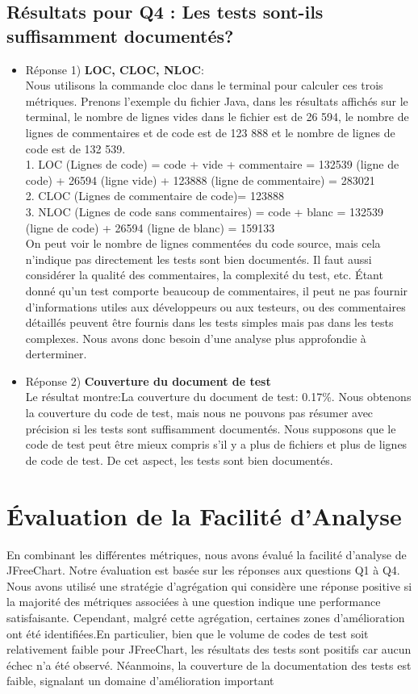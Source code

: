 \documentclass{proc}
\begin{document}
\subsection{Résultats pour Q4 : Les tests sont-ils suffisamment documentés?}
\begin{itemize}
    \item Réponse 1) \textbf{LOC, CLOC, NLOC}: 
    \\ Nous utilisons la commande cloc dans le terminal pour calculer ces trois métriques. Prenons l'exemple du fichier Java, dans les résultats affichés sur le terminal, le nombre de lignes vides dans le fichier est de 26 594, le nombre de lignes de commentaires et de code est de 123 888 et le nombre de lignes de code est de 132 539.
    \\1. LOC (Lignes de code) = code + vide + commentaire = 132539 (ligne de code) + 26594 (ligne vide) + 123888 (ligne de commentaire) = 283021
    \\2. CLOC (Lignes de commentaire de code)= 123888
    \\3. NLOC (Lignes de code sans commentaires) = code + blanc = 132539 (ligne de code) + 26594 (ligne de blanc) = 159133
    \\On peut voir le nombre de lignes commentées du code source, mais cela n'indique pas directement les tests sont bien documentés. Il faut aussi considérer la qualité des commentaires, la complexité du test, etc. Étant donné qu'un test comporte beaucoup de commentaires, il peut ne pas fournir d'informations utiles aux développeurs ou aux testeurs, ou des commentaires détaillés peuvent être fournis dans les tests simples mais pas dans les tests complexes. Nous avons donc besoin d'une analyse plus approfondie à derterminer.
    \item Réponse 2) \textbf{Couverture du document de test}
    \\Le résultat montre:La couverture du document de test: 0.17\%.
    Nous obtenons la couverture du code de test, mais nous ne pouvons pas résumer avec précision si les tests sont suffisamment documentés. Nous supposons que le code de test peut être mieux compris s'il y a plus de fichiers et plus de lignes de code de test. De cet aspect, les tests sont bien documentés.
\end{itemize}

\section{Évaluation de la Facilité d'Analyse}
En combinant les différentes métriques, nous avons évalué la facilité d'analyse de JFreeChart. Notre évaluation est basée sur les réponses aux questions Q1 à Q4. Nous avons utilisé une stratégie d'agrégation qui considère une réponse positive si la majorité des métriques associées à une question indique une performance satisfaisante. Cependant, malgré cette agrégation, certaines zones d'amélioration ont été identifiées.En particulier, bien que le volume de codes de test soit relativement faible pour JFreeChart, les résultats des tests sont positifs car aucun échec n'a été observé. Néanmoins, la couverture de la documentation des tests est faible, signalant un domaine d'amélioration important
\end{document}
